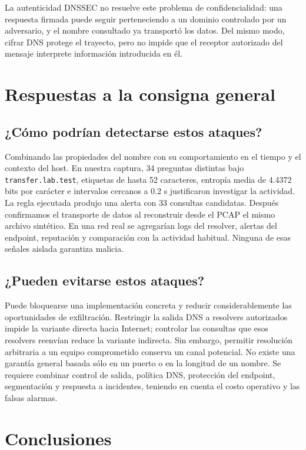 \documentclass[11pt,a4paper]{article}
\begin{document}
La autenticidad DNSSEC no resuelve este problema de confidencialidad: una
respuesta firmada puede seguir perteneciendo a un dominio controlado por un
adversario, y el nombre consultado ya transportó los datos. Del mismo modo,
cifrar DNS protege el trayecto, pero no impide que el receptor autorizado
del mensaje interprete información introducida en él.

\section{Respuestas a la consigna general}

\subsection{¿Cómo podrían detectarse estos ataques?}

Combinando las propiedades del nombre con su comportamiento en el tiempo y
el contexto del host. En nuestra captura, 34 preguntas distintas bajo
\nolinkurl{transfer.lab.test}, etiquetas de hasta 52 caracteres, entropía media
de 4.4372 bits por carácter e intervalos cercanos a 0.2 s justificaron
investigar la actividad. La regla ejecutada produjo una alerta con 33
consultas candidatas. Después confirmamos el transporte de datos al
reconstruir desde el PCAP el mismo archivo sintético. En una red real se
agregarían logs del resolver, alertas del endpoint, reputación y comparación
con la actividad habitual. Ninguna de esas señales aislada garantiza malicia.

\subsection{¿Pueden evitarse estos ataques?}

Puede bloquearse una implementación concreta y reducir considerablemente
las oportunidades de exfiltración. Restringir la salida DNS a resolvers
autorizados impide la variante directa hacia Internet; controlar las
consultas que esos resolvers reenvían reduce la variante indirecta. Sin
embargo, permitir resolución arbitraria a un equipo comprometido conserva
un canal potencial. No existe una garantía general basada sólo en un puerto
o en la longitud de un nombre. Se requiere combinar control de salida,
política DNS, protección del endpoint, segmentación y respuesta a incidentes,
teniendo en cuenta el costo operativo y las falsas alarmas.

\section{Conclusiones}
\end{document}
